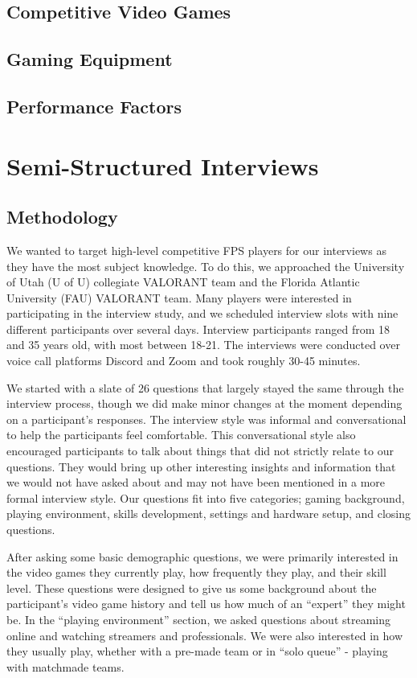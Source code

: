 \documentclass[11pt,manuscript,screen,review]{acmart} %
\begin{document}
\subsection{Competitive Video Games}
\subsection{Gaming Equipment}
\subsection{Performance Factors}

\section{Semi-Structured Interviews}

\subsection{Methodology}
We wanted to target high-level competitive FPS players for our interviews as they have the most subject knowledge. To do this, we approached the University of Utah (U of U) collegiate VALORANT team and the Florida Atlantic University (FAU) VALORANT team. Many players were interested in participating in the interview study, and we scheduled interview slots with nine different participants over several days. 
Interview participants ranged from 18 and 35 years old, with most between 18-21. The interviews were conducted over voice call platforms Discord and Zoom and took roughly 30-45 minutes. 

We started with a slate of 26 questions that largely stayed the same through the interview process, though we did make minor changes at the moment depending on a participant’s responses. The interview style was informal and conversational to help the participants feel comfortable. This conversational style also encouraged participants to talk about things that did not strictly relate to our questions. They would bring up other interesting insights and information that we would not have asked about and may not have been mentioned in a more formal interview style. Our questions fit into five categories; gaming background, playing environment, skills development, settings and hardware setup, and closing questions. 

After asking some basic demographic questions, we were primarily interested in the video games they currently play, how frequently they play, and their skill level. These questions were designed to give us some background about the participant’s video game history and tell us how much of an “expert” they might be. In the “playing environment” section, we asked questions about streaming online and watching streamers and professionals. We were also interested in how they usually play, whether with a pre-made team or in “solo queue” - playing with matchmade teams. 
\end{document}
